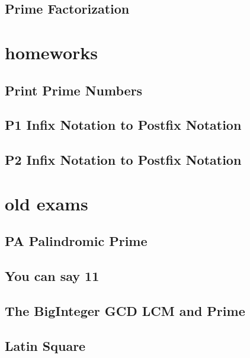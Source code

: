     \subsection{Prime Factorization}
        

\section{homeworks}
    \subsection{Print Prime Numbers}
            
    \subsection{P1 Infix Notation to Postfix Notation}
             
    \subsection{P2 Infix Notation to Postfix Notation}
        

\section{old exams}
    \subsection{PA Palindromic Prime}
            
    \subsection{You can say 11}
        
    \subsection{The BigInteger GCD LCM and Prime}
        
    \subsection{Latin Square}
        

